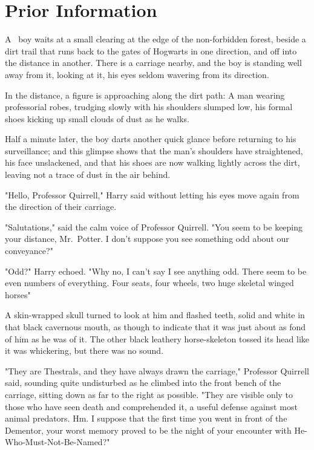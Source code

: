 \chapter{Prior Information}

\lettrine{A}{~} boy waits at a
small clearing at the edge of the non-forbidden forest, beside a dirt trail
that runs back to the gates of Hogwarts in one direction, and off into the
distance in another. There is a carriage nearby, and the boy is standing well
away from it, looking at it, his eyes seldom wavering from its direction.

In the distance, a figure is approaching along the dirt path: A man wearing
professorial robes, trudging slowly with his shoulders slumped low, his formal
shoes kicking up small clouds of dust as he walks.

Half a minute later, the boy darts another quick glance before returning to his
surveillance; and this glimpse shows that the man's shoulders have
straightened, his face unslackened, and that his shoes are now walking lightly
across the dirt, leaving not a trace of dust in the air behind.

"Hello, Professor Quirrell," Harry said without letting his eyes move again
from the direction of their carriage.

"Salutations," said the calm voice of Professor Quirrell. "You seem to be
keeping your distance, Mr.~Potter. I don't suppose you see something odd about
our conveyance?"

"Odd?" Harry echoed. "Why no, I can't say I see anything odd. There seem to be
even numbers of everything. Four seats, four wheels, two huge skeletal winged
horses{\el}"

A skin-wrapped skull turned to look at him and flashed teeth, solid and white
in that black cavernous mouth, as though to indicate that it was just about as
fond of him as he was of it. The other black leathery horse-skeleton tossed its
head like it was whickering, but there was no sound.

"They are Thestrals, and they have always drawn the carriage," Professor
Quirrell said, sounding quite undisturbed as he climbed into the front bench of
the carriage, sitting down as far to the right as possible. "They are visible
only to those who have seen death and comprehended it, a useful defense against
most animal predators. Hm. I suppose that the first time you went in front of
the Dementor, your worst memory proved to be the night of your encounter with
He-Who-Must-Not-Be-Named?"

